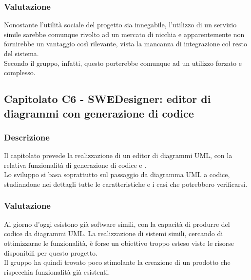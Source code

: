 \subsubsection{Valutazione}
Nonostante l'utilità sociale del progetto sia innegabile, l'utilizzo di un servizio simile sarebbe comunque rivolto ad un mercato di nicchia e apparentemente non fornirebbe un vantaggio così rilevante, vista la mancanza di integrazione col resto del sistema.\\
Secondo il gruppo, infatti, questo porterebbe comunque ad un utilizzo forzato e complesso.

\subsection{Capitolato C6 - SWEDesigner: editor di diagrammi  con generazione di codice}
\subsubsection{Descrizione}
Il capitolato prevede la realizzazione di un editor di diagrammi UML, con la relativa funzionalità di generazione di codice  e .\\
Lo sviluppo si basa soprattutto sul passaggio da diagramma UML a codice, studiandone nei dettagli tutte le caratteristiche e i casi che potrebbero verificarsi.

\subsubsection{Valutazione}
Al giorno d'oggi esistono già software simili, con la capacità di produrre del codice da diagrammi UML. La realizzazione di sistemi simili, cercando di ottimizzarne le funzionalità, è forse un obiettivo troppo esteso viste le risorse disponibili per questo progetto.\\
Il gruppo ha quindi trovato poco stimolante la creazione di un prodotto che rispecchia funzionalità già esistenti.
